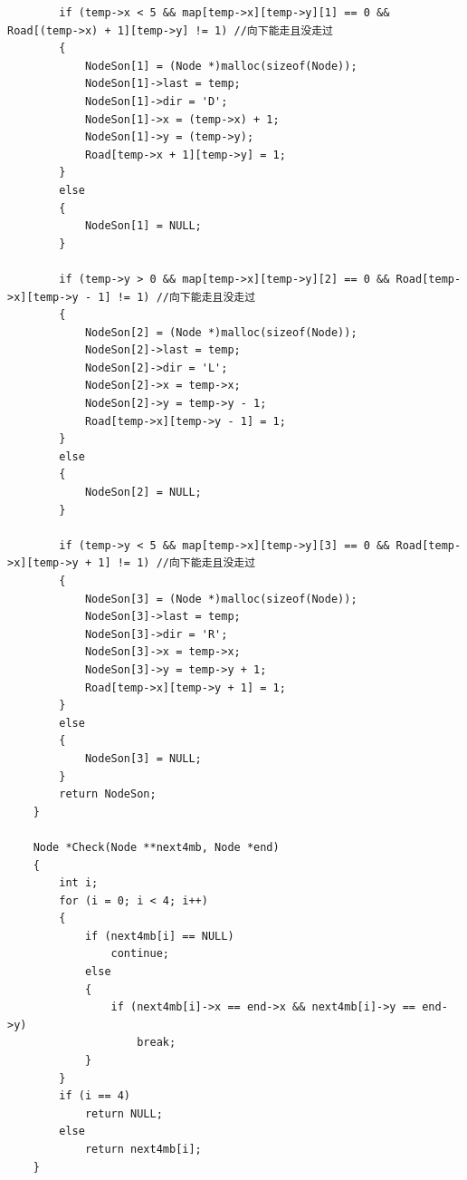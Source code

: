 \documentclass[UTF8]{ctexart}
\begin{document}
\begin{lstlisting}
        if (temp->x < 5 && map[temp->x][temp->y][1] == 0 && Road[(temp->x) + 1][temp->y] != 1) //向下能走且没走过
        {
            NodeSon[1] = (Node *)malloc(sizeof(Node));
            NodeSon[1]->last = temp;
            NodeSon[1]->dir = 'D';
            NodeSon[1]->x = (temp->x) + 1;
            NodeSon[1]->y = (temp->y);
            Road[temp->x + 1][temp->y] = 1;
        }
        else
        {
            NodeSon[1] = NULL;
        }
    
        if (temp->y > 0 && map[temp->x][temp->y][2] == 0 && Road[temp->x][temp->y - 1] != 1) //向下能走且没走过
        {
            NodeSon[2] = (Node *)malloc(sizeof(Node));
            NodeSon[2]->last = temp;
            NodeSon[2]->dir = 'L';
            NodeSon[2]->x = temp->x;
            NodeSon[2]->y = temp->y - 1;
            Road[temp->x][temp->y - 1] = 1;
        }
        else
        {
            NodeSon[2] = NULL;
        }
    
        if (temp->y < 5 && map[temp->x][temp->y][3] == 0 && Road[temp->x][temp->y + 1] != 1) //向下能走且没走过
        {
            NodeSon[3] = (Node *)malloc(sizeof(Node));
            NodeSon[3]->last = temp;
            NodeSon[3]->dir = 'R';
            NodeSon[3]->x = temp->x;
            NodeSon[3]->y = temp->y + 1;
            Road[temp->x][temp->y + 1] = 1;
        }
        else
        {
            NodeSon[3] = NULL;
        }
        return NodeSon;
    }
    
    Node *Check(Node **next4mb, Node *end)
    {
        int i;
        for (i = 0; i < 4; i++)
        {
            if (next4mb[i] == NULL)
                continue;
            else
            {
                if (next4mb[i]->x == end->x && next4mb[i]->y == end->y)
                    break;
            }
        }
        if (i == 4)
            return NULL;
        else
            return next4mb[i];
    }
    

\end{lstlisting}
\end{document}

